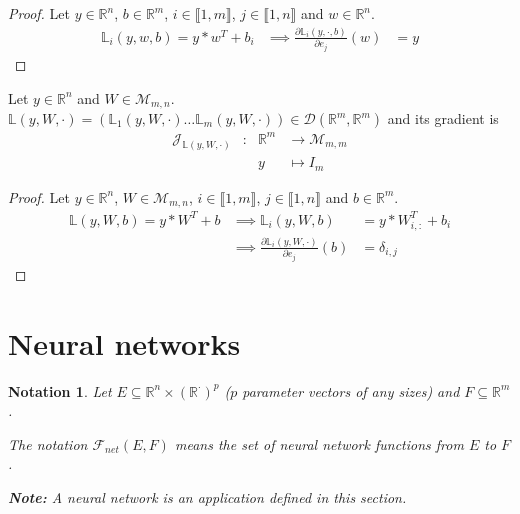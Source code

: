 \documentclass[11pt,en]{elegantpaper}
\newtheorem{notation}{Notation}
\newcommand{\Real}{\mathbb{R}}
\begin{document}
\begin{proof}
  Let $y \in \Real^n$, $b \in \Real^m$, $i \in \llbracket 1,m \rrbracket$, $j \in \llbracket 1,n \rrbracket$
  and $w \in \Real^n$. \begin{equation*}
    \begin{array}{lll}
      \mathbb{L}_i(y,w,b) = y * w^T + b_i & \implies \frac{\partial \mathbb{L}_i(y,\cdot,b)}{\partial e_j} (w) & = y
    \end{array}
  \end{equation*}
\end{proof}

\begin{proposition}
  {\normalfont
    Let $y \in \Real^n$ and $W \in \mathcal{M}_{m,n}$.
    $\mathbb{L}(y,W,\cdot) = (\mathbb{L}_1(y,W,\cdot) \ldots \mathbb{L}_m(y,W,\cdot)) \in \mathcal{D}(\Real^m, \Real^m)$
    and its gradient is \begin{equation} \label{prop:densel_b_differential}
      \begin{array}{llll}
        \mathcal{J}_{\mathbb{L}(y,W,\cdot)} & : & \Real^m  & \longrightarrow \mathcal{M}_{m,m} \\
        &   & y & \longmapsto I_m
      \end{array}
    \end{equation}
  }
\end{proposition}

\begin{proof}
  Let $y \in \Real^n$, $W \in \mathcal{M}_{m,n}$, $i \in \llbracket 1,m \rrbracket$, $j \in \llbracket 1,n \rrbracket$
  and $b \in \Real^m$. \begin{equation*}
    \begin{array}{lll}
      \mathbb{L}(y,W,b) = y * W^T + b & \implies \mathbb{L}_i(y,W,b) & = y * W_{i,:}^T + b_i \\
      & \implies \frac{\partial \mathbb{L}_i(y,W,\cdot)}{\partial e_j} (b) & = \delta_{i,j}
    \end{array}
  \end{equation*}
\end{proof}

\section{Neural networks}

\begin{notation}
  Let $E \subseteq \Real^n \times (\Real^{\cdot})^p$ ($p$ parameter vectors of any sizes) and $F \subseteq \Real^m$. \par
  The notation $\mathcal{F}_{net}(E,F)$ means the set of neural network functions from $E$ to $F$. \par
  \textbf{Note:} A neural network is an application defined in this section. \par
\end{notation}
\end{document}
